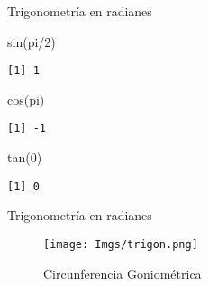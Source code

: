 \documentclass[
  ignorenonframetext,
]{beamer}
\newenvironment{Shaded}{\begin{snugshade}}{\end{snugshade}}
\newcommand{\DecValTok}[1]{\textcolor[rgb]{0.00,0.00,0.81}{#1}}
\newcommand{\FunctionTok}[1]{\textcolor[rgb]{0.00,0.00,0.00}{#1}}
\newcommand{\NormalTok}[1]{#1}
\newcommand{\SpecialCharTok}[1]{\textcolor[rgb]{0.00,0.00,0.00}{#1}}
\begin{document}
\begin{frame}[fragile]{Trigonometría en radianes}
\protect\hypertarget{trigonometruxeda-en-radianes-1}{}
\begin{Shaded}
\begin{Highlighting}[]
\FunctionTok{sin}\NormalTok{(pi}\SpecialCharTok{/}\DecValTok{2}\NormalTok{)}
\end{Highlighting}
\end{Shaded}

\begin{verbatim}
[1] 1
\end{verbatim}

\begin{Shaded}
\begin{Highlighting}[]
\FunctionTok{cos}\NormalTok{(pi)}
\end{Highlighting}
\end{Shaded}

\begin{verbatim}
[1] -1
\end{verbatim}

\begin{Shaded}
\begin{Highlighting}[]
\FunctionTok{tan}\NormalTok{(}\DecValTok{0}\NormalTok{)}
\end{Highlighting}
\end{Shaded}

\begin{verbatim}
[1] 0
\end{verbatim}
\end{frame}

\begin{frame}{Trigonometría en radianes}
\protect\hypertarget{trigonometruxeda-en-radianes-2}{}
\begin{figure}
\centering
\texttt{[image: Imgs/trigon.png]}
\caption{Circunferencia Goniométrica}
\end{figure}
\end{frame}
\end{document}
